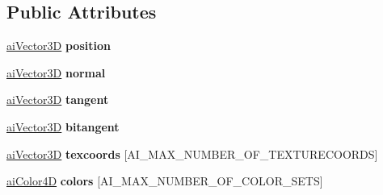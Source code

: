 \subsection*{Public Attributes}
\begin{DoxyCompactItemize}
\item 
\hypertarget{class_assimp_1_1_vertex_a51221e3e2a5e5f15d956313f8816ee80}{\hyperlink{structai_vector3_d}{ai\+Vector3\+D} {\bfseries position}}\label{class_assimp_1_1_vertex_a51221e3e2a5e5f15d956313f8816ee80}

\item 
\hypertarget{class_assimp_1_1_vertex_a09c4c9b9877537de3b143ecffb99408b}{\hyperlink{structai_vector3_d}{ai\+Vector3\+D} {\bfseries normal}}\label{class_assimp_1_1_vertex_a09c4c9b9877537de3b143ecffb99408b}

\item 
\hypertarget{class_assimp_1_1_vertex_ac4ecbc39eb88a5f516e357178543c3dd}{\hyperlink{structai_vector3_d}{ai\+Vector3\+D} {\bfseries tangent}}\label{class_assimp_1_1_vertex_ac4ecbc39eb88a5f516e357178543c3dd}

\item 
\hypertarget{class_assimp_1_1_vertex_a8022c610eb4fb8668b98f8f1fbec3f06}{\hyperlink{structai_vector3_d}{ai\+Vector3\+D} {\bfseries bitangent}}\label{class_assimp_1_1_vertex_a8022c610eb4fb8668b98f8f1fbec3f06}

\item 
\hypertarget{class_assimp_1_1_vertex_a3762b01faaedd03cbbeefec05ddd325c}{\hyperlink{structai_vector3_d}{ai\+Vector3\+D} {\bfseries texcoords} \mbox{[}A\+I\+\_\+\+M\+A\+X\+\_\+\+N\+U\+M\+B\+E\+R\+\_\+\+O\+F\+\_\+\+T\+E\+X\+T\+U\+R\+E\+C\+O\+O\+R\+D\+S\mbox{]}}\label{class_assimp_1_1_vertex_a3762b01faaedd03cbbeefec05ddd325c}

\item 
\hypertarget{class_assimp_1_1_vertex_a9133ffca5e2bf7a1f155df29be1ed07e}{\hyperlink{structai_color4_d}{ai\+Color4\+D} {\bfseries colors} \mbox{[}A\+I\+\_\+\+M\+A\+X\+\_\+\+N\+U\+M\+B\+E\+R\+\_\+\+O\+F\+\_\+\+C\+O\+L\+O\+R\+\_\+\+S\+E\+T\+S\mbox{]}}\label{class_assimp_1_1_vertex_a9133ffca5e2bf7a1f155df29be1ed07e}

\end{DoxyCompactItemize}
